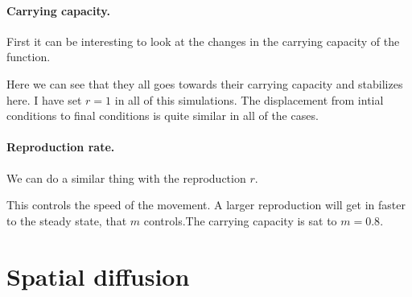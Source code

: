 \documentclass{book}
\begin{document}

\paragraph{Carrying capacity.}
First it can be interesting to look at the changes in the carrying capacity of
the function.


Here we can see that they all goes towards their carrying capacity and stabilizes here.
I have set $r=1$ in all of this simulations. The displacement from intial conditions to
final conditions is quite similar in all of the cases.

\paragraph{Reproduction rate.}
We can do a similar thing with the reproduction $r$.


This controls the speed of the movement. A larger reproduction will get in faster
to the steady state, that $m$ controls.The carrying capacity is sat to $m=0.8$.


\section{Spatial diffusion}
\end{document}
